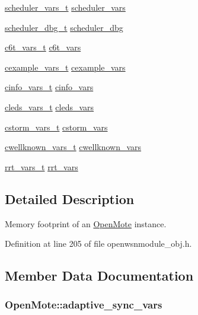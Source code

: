 \begin{DoxyCompactItemize}
\hyperlink{structscheduler__vars__t}{scheduler\+\_\+vars\+\_\+t} \hyperlink{struct_open_mote_a09fb00669f5bb4ac598ad50f789ea03c}{scheduler\+\_\+vars}
\item 
\hyperlink{structscheduler__dbg__t}{scheduler\+\_\+dbg\+\_\+t} \hyperlink{struct_open_mote_a64bbadb0cb6de192bf1aece2a5d42580}{scheduler\+\_\+dbg}
\item 
\hyperlink{structc6t__vars__t}{c6t\+\_\+vars\+\_\+t} \hyperlink{struct_open_mote_aafb440c974a45fce8dce5a1bcfbe8360}{c6t\+\_\+vars}
\item 
\hyperlink{structcexample__vars__t}{cexample\+\_\+vars\+\_\+t} \hyperlink{struct_open_mote_a2601bf500d6585a238281c665c0eecee}{cexample\+\_\+vars}
\item 
\hyperlink{structcinfo__vars__t}{cinfo\+\_\+vars\+\_\+t} \hyperlink{struct_open_mote_a8a59e70923fa709385930eab33599db4}{cinfo\+\_\+vars}
\item 
\hyperlink{structcleds__vars__t}{cleds\+\_\+vars\+\_\+t} \hyperlink{struct_open_mote_af6231c89f1008084144bf1fe1706a016}{cleds\+\_\+vars}
\item 
\hyperlink{structcstorm__vars__t}{cstorm\+\_\+vars\+\_\+t} \hyperlink{struct_open_mote_a13239242a3bd108d2c5f5152f7cf5a66}{cstorm\+\_\+vars}
\item 
\hyperlink{structcwellknown__vars__t}{cwellknown\+\_\+vars\+\_\+t} \hyperlink{struct_open_mote_a0b1c0999849a0f4f6667f7b736e4d2fa}{cwellknown\+\_\+vars}
\item 
\hyperlink{structrrt__vars__t}{rrt\+\_\+vars\+\_\+t} \hyperlink{struct_open_mote_ab3971cd4d94d74662025d9551d008cbc}{rrt\+\_\+vars}
\end{DoxyCompactItemize}


\subsection{Detailed Description}
Memory footprint of an \hyperlink{struct_open_mote}{Open\+Mote} instance. 

Definition at line 205 of file openwsnmodule\+\_\+obj.\+h.



\subsection{Member Data Documentation}
\subsubsection[{\texorpdfstring{adaptive\+\_\+sync\+\_\+vars}{adaptive_sync_vars}}]{ Open\+Mote\+::adaptive\+\_\+sync\+\_\+vars}\hypertarget{struct_open_mote_a46fd6d534d0e28197bdbd47463598890}{}\label{struct_open_mote_a46fd6d534d0e28197bdbd47463598890}


